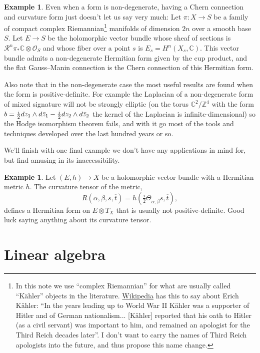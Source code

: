 \documentclass[10pt,a4paper]{amsart}
\theoremstyle{definition}
\newtheorem{exam}[theo]{Example}
\newcommand{\kk}[1]{\mathbb{#1}}
\def\ov#1{\overline{#1}}
\def\kahler{complex Riemannian}
\begin{document}
\begin{exam}
Even when a form is non-degenerate, having a Chern connection and curvature
form just doesn't let us say very much: Let $\pi : X \to S$ be a family of
compact \kahler\footnote{In this note we use ``\kahler{}'' for what
are usually called ``K\"ahler'' objects in the literature.
\href{https://en.wikipedia.org/wiki/Erich_Kähler}{Wikipedia} has this to say about Erich K\"ahler:
``In the years leading up to World War II Kähler was a supporter of Hitler and
of German nationalism...
[K\"ahler] reported that his oath to Hitler (as a civil servant) was important
to him, and remained an apologist for the Third Reich decades later''.
I don't want to carry the names of Third Reich apologists into the
future, and thus propose this name change.
}
manifolds of dimension $2n$ over a smooth base $S$.
Let $E \to S$ be the holomorphic vector bundle whose sheaf of sections is
$\mathcal R^{n}\pi_{*}\mathbb C \otimes \mathcal O_{S}$ and whose fiber over a
point $s$ is $E_{s} = H^{n}(X_{s}, \mathbb C)$. This vector bundle admits a
non-degenerate Hermitian form given by the cup product, and the flat
Gauss--Manin connection is the Chern connection of this Hermitian form.
\end{exam}

Also note that in the non-degenerate case the most useful results are found
when the form is positive-definite. For example the Laplacian of a
non-degenerate form of mixed signature will not be strongly elliptic
(on the torus $\kk C^2 / \kk Z^4$ with the form $b = \smash{\frac i2}
dz_1 \wedge d \bar z_1 - \smash{\frac i2} dz_2 \wedge d\bar z_2$ the kernel of
the Laplacian is infinite-dimensional)
so the Hodge isomorphism theorem fails, and with it go most of the tools and techniques developed over the last hundred years or so.

We'll finish with one final example we don't have any applications in mind for, but find amusing in its inaccessibility.

\begin{exam}
Let $(E,h) \to X$ be a holomorphic vector bundle with a Hermitian metric $h$. The curvature tensor of the metric,
\[
  R(\alpha, \ov\beta, s, \ov t)
  = h(\tfrac i2 \Theta_{\alpha, \ov\beta}s, \ov t),
\]
defines a Hermitian form on $E \otimes T_{X}$ that is usually not positive-definite. Good luck saying anything about its curvature tensor.
\end{exam}



\section{Linear algebra}
\label{sec:degenerate-linear-algebra}
\end{document}
